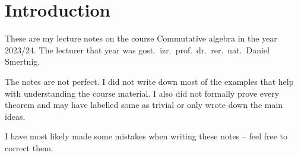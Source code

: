 \section*{Introduction}

These are my lecture notes on the course Commutative algebra in
the year 2023/24. The lecturer that year was
gost.~izr.~prof.~dr.~rer.~nat.~Daniel Smertnig.

The notes are not perfect. I did not write down most of the examples
that help with understanding the course material. I also did not
formally prove every theorem and may have labelled some as trivial or
only wrote down the main ideas.

I have most likely made some mistakes when writing these notes --
feel free to correct them.
